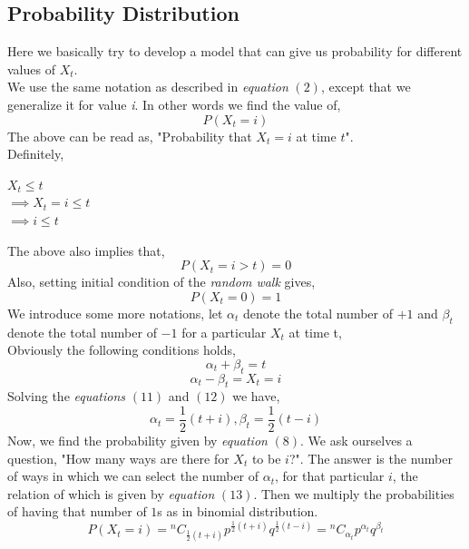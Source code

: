 \documentclass[12pt,a4paper]{article}%
\newcommand*{\Comb}[2]{{}^{#1}C_{#2}}
\begin{document}
	\subsection{Probability Distribution}
	Here we basically try to develop a model that can give us probability for different values of $X_{t}$.\\
	We use the same notation as described in \textit{equation} $(2)$, except that we generalize it for value \textit{i}. In other words we find the value of,\\
	\begin{equation}
		P(X_{t}=i)
	\end{equation}
	The above can be read as, "Probability that $X_{t}=i$ at time $t$".\\\smallskip
	Definitely,
	\begin{center}
		$X_{t}\leq t$\\
		$\implies X_{t}=i \leq t$\\
		$\implies i \leq t$
	\end{center}
	The above also implies that,
	\begin{equation}
		P(X_{t}=i>t)=0
	\end{equation}
	 Also, setting initial condition of the \textit{random walk} gives,
	 \begin{equation}
	  	P(X_{t}=0)=1
	 \end{equation}
	 We introduce some more notations, let $\alpha_{ t}$ denote the total number of $+1$ and $\beta_{ t}$ denote the total number of $-1$ for a particular $X_{t}$ at time t,\\\smallskip
	 Obviously the following conditions holds,
	 \begin{equation}
	 	\alpha_{ t}+\beta_{ t}=t
	 \end{equation}
	 \begin{equation}
		\alpha_{ t}-\beta_{ t}=X_{t}=i
	 \end{equation}
	 Solving the \textit{equations}  $(11)$ and $(12)$ we have,
	 \begin{equation}
	 	\alpha_{ t} =\dfrac{1}{2}(t+i), \beta_{ t} =\dfrac{1}{2}(t-i)
	 \end{equation}
	 \pagebreak
	 Now, we find the probability given by \textit{equation} $(8)$. We ask ourselves a question, "How many ways are there for $X_{t}$ to be $i$?". The answer is the number of ways in which we can select the number of $\alpha_{ t}$, for that particular $i$, the relation of which is given by \textit{equation} $(13)$. Then we multiply the probabilities of having that number of $1$s as in binomial distribution. \\\bigskip
	 \begin{equation}
	 	\boxed{P(X_{t}=i)=\Comb{n}{\frac{1}{2}(t+i)}p^{\frac{1}{2}(t+i)}q^{\frac{1}{2}(t-i)}=\Comb{n}{\alpha_{t}}p^{\alpha_{t}}q^{\beta_{t}}}
	 \end{equation}
\end{document}
